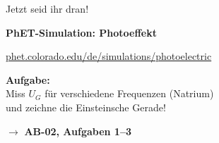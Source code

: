 \documentclass[aspectratio=169,11pt]{beamer}
\begin{document}
\begin{frame}{Jetzt seid ihr dran!}

\begin{center}
\Large
\textbf{PhET-Simulation: Photoeffekt}

\vspace{1em}

\normalsize
\url{phet.colorado.edu/de/simulations/photoelectric}

\vspace{2em}

\textbf{Aufgabe:}\\
Miss $U_G$ für verschiedene Frequenzen (Natrium)\\
und zeichne die Einsteinsche Gerade!

\vspace{2em}

$\rightarrow$ \textbf{AB-02, Aufgaben 1--3}
\end{center}

\end{frame}
\end{document}
